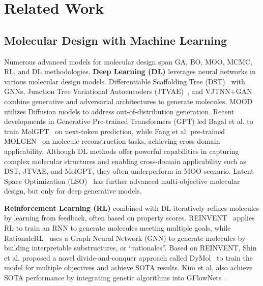 \section{Related Work}
\subsection{Molecular Design with Machine Learning}
Numerous advanced models for molecular design span GA, BO, MOO, MCMC, RL, and DL methodologies. \textbf{Deep Learning (DL)} leverages neural networks in various molecular design models. Differentiable Scaffolding Tree (DST)~\cite{fu2021dst} with GNNs, Junction Tree Variational Autoencoders (JTVAE)~\cite{jin2018jtvae}, and VJTNN+GAN~\cite{VJTNNGan} combine generative and adversarial architectures to generate molecules. MOOD~\cite{mood} utilizes Diffusion models to address out-of-distribution generation. Recent developments in Generative Pre-trained Transformers (GPT) led Bagal et al. to train MolGPT~\cite{2021molgpt} on next-token prediction, while Fang et al. pre-trained MOLGEN~\cite{2024molgen} on molecule reconstruction tasks, achieving cross-domain applicability. Although DL methods offer powerful capabilities in capturing complex molecular structures and enabling cross-domain applicability such as DST, JTVAE, and MolGPT, they often underperform in MOO scenario. Latent Space Optimization (LSO)~\cite{abeer2024lso} has further advanced multi-objective molecular design, but only for deep generative models. 

\textbf{Reinforcement Learning (RL)} combined with DL iteratively refines molecules by learning from feedback, often based on property scores. REINVENT~\cite{olivecrona2017reinvent} applies RL to train an RNN to generate molecules meeting multiple goals, while RationaleRL~\cite{rationaleRL} uses a Graph Neural Network (GNN) to generate molecules by building interpretable substructures, or ``rationales''. Based on REINVENT, Shin et al. proposed a novel divide-and-conquer approach called DyMol~\cite{dymol} to train the model for multiple objectives and achieve SOTA results. Kim et al. also achieve SOTA performance by integrating genetic algorithms into GFlowNets~\cite{genetic-gfn}.


